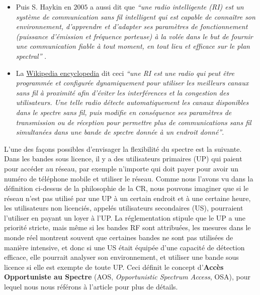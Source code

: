 \begin{resume_fr}
\begin{itemize}
    \item
    Puis S. Haykin en $2005$ a aussi dit que
    \emph{``une radio intelligente (RI) est un système de communication sans fil intelligent qui est capable de connaître son environnement, d'apprendre et d'adapter ses paramètres de fonctionnement (puissance d'émission et fréquence porteuse) à la volée dans le but de fournir une communication fiable à tout moment, en tout lieu et efficace sur le plan spectral''} \cite{Haykin05}.

    \item
    La \href{https://en.wikipedia.org/wiki/Cognitive_radio}{Wikipedia encyclopedia} dit ceci
    \emph{``une RI est une radio qui peut être programmée et configurée dynamiquement pour utiliser les meilleurs canaux sans fil à proximité afin d'éviter les interférences et la congestion des utilisateurs. Une telle radio détecte automatiquement les canaux disponibles dans le spectre sans fil, puis modifie en conséquence ses paramètres de transmission ou de réception pour permettre plus de communications sans fil simultanées dans une bande de spectre donnée à un endroit donné''}.
\end{itemize}

L'une des façons possibles d'envisager la flexibilité du spectre est la suivante.
%
Dans les bandes sous licence, il y a des utilisateurs primaires (UP) qui paient pour accéder au réseau, par exemple n'importe qui doit payer pour avoir un numéro de téléphone mobile et utiliser le réseau.
Comme nous l'avons vu dans la définition ci-dessus de la philosophie de la CR, nous pouvons imaginer que si le réseau n'est pas utilisé par une UP à un certain endroit et à une certaine heure, les utilisateurs non licenciés, appelés utilisateurs secondaires (US), pourraient l'utiliser en payant un loyer à l'UP.
%
La réglementation stipule que le UP a une priorité stricte,
mais même si les bandes RF sont attribuées, les mesures dans le monde réel montrent souvent que certaines bandes ne sont pas utilisées de manière intensive, et donc si une US était équipée d'une capacité de détection efficace, elle pourrait analyser son environnement, et utiliser une bande sous licence si elle est exempte de toute UP.
Ceci définit le concept d'\textbf{Accès Opportuniste au Spectre} (AOS, \emph{Opportunistic Spectrum Access}, OSA), pour lequel nous nous référons à l'article \cite{Zhao07} pour plus de détails.



\end{resume_fr}
